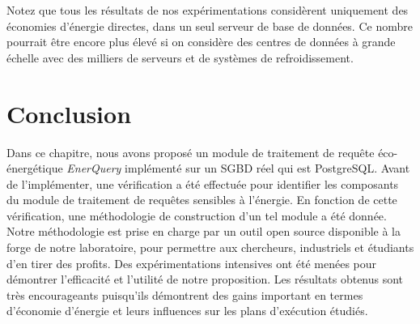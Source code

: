 Notez que tous les résultats de nos expérimentations considèrent uniquement des économies d'énergie directes, dans un seul serveur de base de données. Ce nombre pourrait être encore plus élevé si on considère des centres de données à grande échelle avec des milliers de serveurs et de systèmes de refroidissement.

\section{Conclusion}
Dans ce chapitre, nous avons proposé un module de traitement de requête éco-énergétique \textit{EnerQuery} implémenté sur un SGBD réel qui est PostgreSQL. Avant de l'implémenter, une vérification a été effectuée pour identifier les composants du module de traitement de requêtes sensibles à l'énergie. En fonction de cette vérification, une méthodologie de construction d'un tel module a été donnée. Notre méthodologie est prise en charge par un outil open source disponible à la forge de notre laboratoire, pour permettre aux chercheurs, industriels et étudiants d'en tirer des profits. Des expérimentations intensives ont été menées pour démontrer l'efficacité et l'utilité de notre proposition. Les résultats obtenus sont très encourageants puisqu'ils démontrent des gains important en termes d’économie d’énergie et leurs influences sur les plans d’exécution étudiés.
